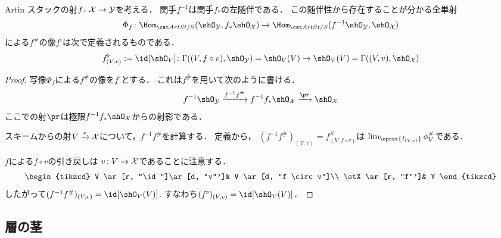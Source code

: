     \begin{Lemma}
         Artin スタックの射$f \colon \mathcal{X} \to \mathcal{Y}$を考える．
        関手$f^{-1}$は関手$f_*$の左随伴である．
        この随伴性から存在することが分かる全単射
        \[ \Phi_{f} \colon \Hom_{\ArtSt/S}(\shO_{\stY}, f_*\shO_{\stX}) \to \Hom_{\ArtSt/S}(f^{-1}\shO_{\stY}, \shO_{\stX}) \]
        による$f^{\#}$の像$f^{\flat}$は次で定義されるものである．
        \[
            f^{\flat}_{(V,v)}:=\id[\shO_{V}] \colon
            \Gamma((V, f \circ v), \shO_{\stY})=\shO_{V}(V) \to \shO_{V}(V)=\Gamma((V,v),\shO_{\stX})
        \]
    \end{Lemma}
    \begin{proof}
        写像$\Phi_{f}$による$f^{\#}$の像を$f^{\flat}$とする．
        これは$f^{\#}$を用いて次のように書ける．
        \[ f^{-1}\shO_{\stY} \xto{f^{-1}f^{\#}} f^{-1}f_*\shO_{\stX} \xto{\pr} \shO_{\stX} \]
        ここでの射$\pr$は極限$f^{-1}f_*\shO_{\stX}$からの射影である．

        スキームからの射$V \xrightarrow{v} \mathcal{X}$について，$f^{-1}f^{\#}$を計算する．
        定義から，
        $(f^{-1}f^{\#})_{(V,v)}=f^{\#}_{(V,f \circ v)}$は
        $\lim_{\opcat{I_{(V,v)}}} \phi^{\#}_{V}$である．

        $f$による$f \circ v$の引き戻しは
        $v \colon V \to \mathcal{X}$であることに注意する．
        \[
        \begin{tikzcd}
            V \ar[r, "\id"]\ar[d, "v"']& V \ar[d, "f \circ v"]\\
            \stX \ar[r, "f"']& Y
        \end{tikzcd}
        \]
        したがって$(f^{-1}f^{\#})_{(V,v)}=\id[\shO_{V}(V)]$.
        すなわち$(f^{\flat})_{(V,v)}=\id[\shO_{V}(V)]$．
    \end{proof}
    
    \subsection{層の茎}

